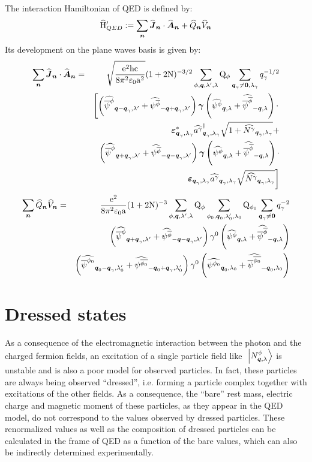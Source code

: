 \documentclass[10pt,a4paper,twoside,openany]{book}
\begin{document}
The interaction Hamiltonian of QED is defined by:
\begin{equation*}
\HopQED \eqdef \sum_{\n} \Jop \n \ssp \Aop \n + \Qop \n \Vop \n
\end{equation*}
Its development on the plane waves basis is given by:
\begin{eqnarray*}
\sum_{\n} \Jop \n \ssp \Aop \n & = & \sqrt{\frac{\e^2 \h \c}{8 \pi^2 \vpty \a^2}} ( 1 + 2 \N )^{-3/2} \sum_{\pt, \q, \sp', \sp} \Qp \pt \sum_{\q_\photon \neq \sv 0, \sp_\photon} q_\photon^{-1/2} \\
&& \left[ \left( \SCop \pt {\q - \q_\photon} {\sp'} + \SAop {\antiparticle \pt} {-\q + \q_\photon} {\sp'} \right) \gamvec \left( \SAop \pt \q \sp + \SCop {\antiparticle \pt} {-\q} \sp \right) \ssp \right. \\
&& \cphotonspin {\q_\photon} {\sp_\photon} \cop \photon {\q_\photon} {\sp_\photon} \sqrt{1 + \Nop \photon {\q_\photon} {\sp_\photon}} + \\
&& \left( \SCop \pt {\q + \q_\photon} {\sp'} + \SAop {\antiparticle \pt} {-\q - \q_\photon} {\sp'} \right) \gamvec \left( \SAop \pt \q \sp + \SCop {\antiparticle \pt} {-\q} \sp \right) \ssp \\
&& \left. \photonspin {\q_\photon} {\sp_\photon} \aop \photon {\q_\photon} {\sp_\photon} \sqrt{\Nop \photon {\q_\photon} {\sp_\photon}} \right]
\end{eqnarray*}
\begin{eqnarray*}
\sum_{\n} \Qop \n \Vop \n & = & \frac{\e^2}{8 \pi^2 \vpty \a} ( 1 + 2 \N )^{-3} \sum_{\pt,\q,\sp',\sp} \Qp \pt \sum_{\pt_0,\q_0,\sp'_0,\sp_0} \Qp {\pt_0} \sum_{\q_\photon \neq \sv 0} q_\photon^{-2} \\
&& \left( \SCop \pt {\q + \q_\photon} {\sp'} + \SAop {\antiparticle \pt} {-\q - \q_\photon} {\sp'} \right) \gammat 0 \left( \SAop \pt \q \sp + \SCop {\antiparticle \pt} {-\q} \sp \right) \\
&& \left( \SCop {\pt_0} {\q_0 - \q_\photon} {\sp'_0} + \SAop {\antiparticle {\pt_0}} {-\q_0 + \q_\photon} {\sp'_0} \right) \gammat 0 \left( \SAop {\pt_0} {\q_0} {\sp_0} + \SCop {\antiparticle {\pt_0}} {-\q_0} {\sp_0} \right)
\end{eqnarray*}

\section{Dressed states}

As a consequence of the electromagnetic interaction between the photon and the charged fermion fields, an excitation of a single particle field like $\ketQ N \pt \q \sp$ is unstable and is also a poor model for observed particles. In fact, these particles are always being observed ``dressed'', i.e. forming a particle complex together with excitations of the other fields. As a consequence, the ``bare'' rest mass, electric charge and magnetic moment of these particles, as they appear in the QED model, do not correspond to the values observed by dressed particles. These renormalized values as well as the composition of dressed particles can be calculated in the frame of QED as a function of the bare values, which can also be indirectly determined experimentally.
\end{document}

